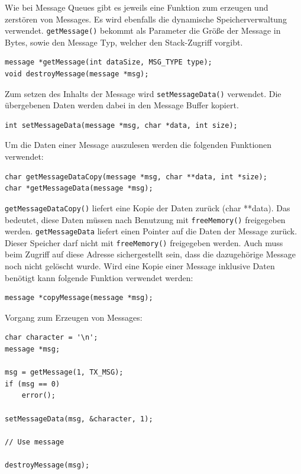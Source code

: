 \documentclass[fontsize=12pt, toc=bibliography, notitlepage]{scrreprt}
\begin{document}
Wie bei Message Queues gibt es jeweils eine Funktion zum erzeugen und zerstören von Messages. Es wird ebenfalls die dynamische Speicherverwaltung verwendet. \lstinline$getMessage()$ bekommt als Parameter die Größe der Message in Bytes, sowie den Message Typ, welcher den Stack-Zugriff vorgibt.\\

\begin{lstlisting}
message *getMessage(int dataSize, MSG_TYPE type);
void destroyMessage(message *msg);
\end{lstlisting}

Zum setzen des Inhalts der Message wird \lstinline$setMessageData()$ verwendet. Die übergebenen Daten werden dabei in den Message Buffer kopiert.\\

\begin{lstlisting}
int setMessageData(message *msg, char *data, int size);
\end{lstlisting}

Um die Daten einer Message auszulesen werden die folgenden Funktionen verwendet:\\

\begin{lstlisting}
char getMessageDataCopy(message *msg, char **data, int *size);
char *getMessageData(message *msg);
\end{lstlisting}

\lstinline$getMessageDataCopy()$ liefert eine Kopie der Daten zurück (char **data). Das bedeutet, diese Daten müssen nach Benutzung mit \lstinline$freeMemory()$  freigegeben werden. \lstinline$getMessageData$ liefert einen Pointer auf die Daten der Message zurück. Dieser Speicher darf nicht mit \lstinline$freeMemory()$  freigegeben werden. Auch muss beim Zugriff auf diese Adresse sichergestellt sein, dass die dazugehörige Message noch nicht gelöscht wurde. Wird eine Kopie einer Message inklusive Daten benötigt kann folgende Funktion verwendet werden:\\

\begin{lstlisting}
message *copyMessage(message *msg);
\end{lstlisting}

Vorgang zum Erzeugen von Messages:\\

\begin{lstlisting}
char character = '\n';
message *msg;

msg = getMessage(1, TX_MSG);
if (msg == 0)
	error();
	
setMessageData(msg, &character, 1);

// Use message

destroyMessage(msg);
\end{lstlisting}
\end{document}
